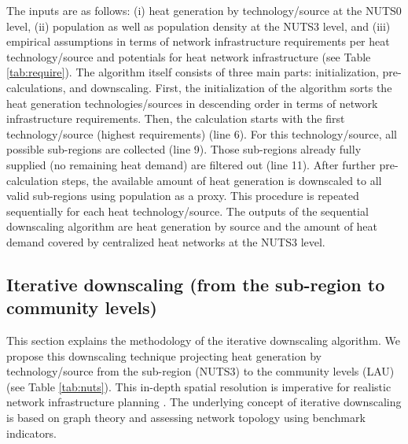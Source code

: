 The inputs are as follows: (i) heat generation by technology/source at the NUTS0 level, (ii) population as well as population density at the NUTS3 level, and (iii) empirical assumptions in terms of network infrastructure requirements per heat technology/source and potentials for heat network infrastructure (see Table \ref{tab:require}). The algorithm itself consists of three main parts: initialization, pre-calculations, and downscaling. First, the initialization of the algorithm sorts the heat generation technologies/sources in descending order in terms of network infrastructure requirements. Then, the calculation starts with the first technology/source (highest requirements) (line 6). For this technology/source, all possible sub-regions are collected (line 9). Those sub-regions already fully supplied (no remaining heat demand) are filtered out (line 11). After further pre-calculation steps, the available amount of heat generation is downscaled to all valid sub-regions using population as a proxy. This procedure is repeated sequentially for each heat technology/source. The outputs of the sequential downscaling algorithm are heat generation by source and the amount of heat demand covered by centralized heat networks at the NUTS3 level.

\subsection{Iterative downscaling (from the sub-region to community levels)}\label{alg2}
This section explains the methodology of the iterative downscaling algorithm. We propose this downscaling technique projecting heat generation by technology/source from the sub-region (NUTS3) to the community levels (LAU) (see Table \ref{tab:nuts}). This in-depth spatial resolution is imperative for realistic network infrastructure planning \cite{zvoleff2009impact}. The underlying concept of iterative downscaling is based on graph theory and assessing network topology using benchmark indicators. 

